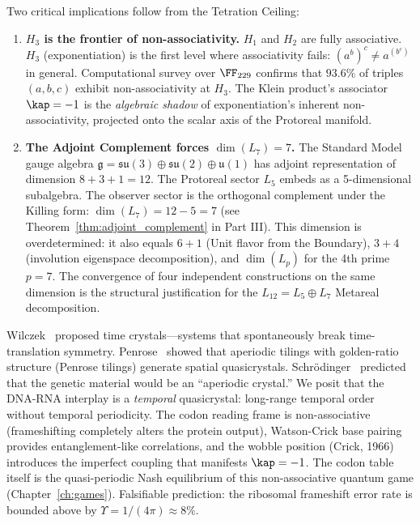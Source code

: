 Two critical implications follow from the Tetration Ceiling:

\begin{enumerate}
\item \textbf{$H_3$ is the frontier of non-associativity.} $H_1$ and $H_2$ are fully associative. $H_3$ (exponentiation) is the first level where associativity fails: $(a^b)^c \neq a^{(b^c)}$ in general. Computational survey over $\FF_{229}$ confirms that $93.6\%$ of triples $(a, b, c)$ exhibit non-associativity at $H_3$. The Klein product's associator $\kap = -1$ is the \emph{algebraic shadow} of exponentiation's inherent non-associativity, projected onto the scalar axis of the Protoreal manifold.

\item \textbf{The Adjoint Complement forces $\dim(L_7) = 7$.} The Standard Model gauge algebra $\mathfrak{g} = \mathfrak{su}(3) \oplus \mathfrak{su}(2) \oplus \mathfrak{u}(1)$ has adjoint representation of dimension $8 + 3 + 1 = 12$. The Protoreal sector $L_5$ embeds as a 5-dimensional subalgebra. The observer sector is the orthogonal complement under the Killing form: $\dim(L_7) = 12 - 5 = 7$ (see Theorem~\ref{thm:adjoint_complement} in Part III). This dimension is overdetermined: it also equals $6 + 1$ (Unit flavor from the Boundary), $3 + 4$ (involution eigenspace decomposition), and $\dim(L_p)$ for the 4th prime $p = 7$. The convergence of four independent constructions on the same dimension is the structural justification for the $L_{12} = L_5 \oplus L_7$ Metareal decomposition.
\end{enumerate}

\begin{remark}\label{rem:temporal-qc}
Wilczek~\cite{wilczek2012} proposed time crystals---systems that spontaneously break time-translation symmetry. Penrose~\cite{penrose1974} showed that aperiodic tilings with golden-ratio structure (Penrose tilings) generate spatial quasicrystals. Schr\"odinger~\cite{schrodinger1944} predicted that the genetic material would be an ``aperiodic crystal.'' We posit that the DNA-RNA interplay is a \emph{temporal} quasicrystal: long-range temporal order without temporal periodicity. The codon reading frame is non-associative (frameshifting completely alters the protein output), Watson-Crick base pairing provides entanglement-like correlations, and the wobble position (Crick, 1966) introduces the imperfect coupling that manifests $\kap = -1$. The codon table itself is the quasi-periodic Nash equilibrium of this non-associative quantum game (Chapter~\ref{ch:games}). Falsifiable prediction: the ribosomal frameshift error rate is bounded above by $\Upsilon = 1/(4\pi) \approx 8\%$.
\end{remark}

